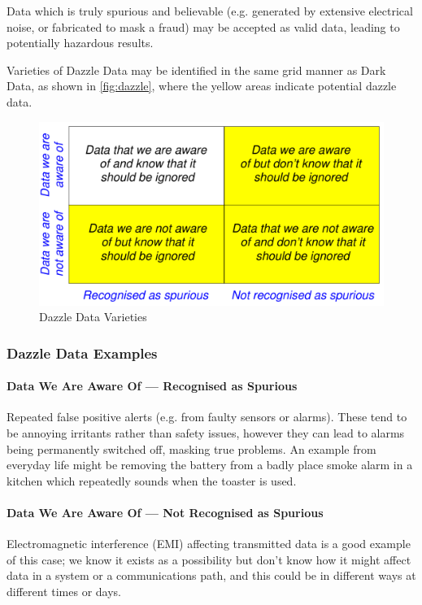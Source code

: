 Data which is truly spurious and believable (e.g. generated by extensive electrical noise, or fabricated to mask a fraud) may be accepted as valid data, leading to potentially hazardous results. 

Varieties of Dazzle Data may be identified in the same grid manner as Dark Data, as shown in \autoref{fig:dazzle}, where the yellow areas indicate potential dazzle data.

\begin{figure}[htbp]
  \centering
  \includegraphics[width=\textwidth/2]{images/dazzleknowns.pdf}
  \caption{Dazzle Data Varieties}
  \label{fig:dazzle}
\end{figure}

\clearpage
\subsubsection{Dazzle Data Examples}

\paragraph{Data We Are Aware Of --- Recognised as Spurious}
Repeated false positive alerts (e.g. from faulty sensors or alarms). These tend to be annoying irritants rather than safety issues, however they can lead to alarms being permanently switched off, masking true problems. An example from everyday life might be removing the battery from a badly place smoke alarm in a kitchen which repeatedly sounds when the toaster is used.

\paragraph{Data We Are Aware Of --- Not Recognised as Spurious}
Electromagnetic interference (EMI) affecting transmitted data is a good example of this case; we know it exists as a possibility but don't know how it might affect data in a system or a communications path, and this could be in different ways at different times or days.

